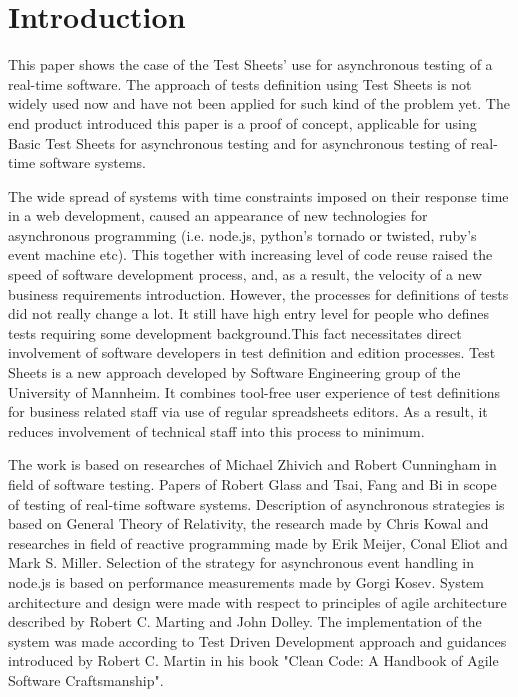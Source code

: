 \chapter{Introduction}
\label{chap:intro}
This paper shows the case of the Test Sheets' use for asynchronous testing of a real-time software. The approach of tests definition using Test Sheets is not widely used now and have not been applied for such kind of the problem yet.
The end product introduced this paper is a proof of concept,  applicable for using Basic Test Sheets for asynchronous testing and for asynchronous testing of real-time software systems.

The wide spread of systems with time constraints imposed on their response time in a web development, caused an appearance of new technologies for asynchronous programming (i.e. node.js, python's tornado or twisted, ruby's event machine etc). This together with increasing level of code reuse raised the speed of software development process, and, as a result, the velocity of a new business requirements introduction. However, the processes for definitions of tests did not really change a lot. It still have high entry level for people who defines tests requiring some development background.This fact necessitates direct involvement of software developers in test definition and edition processes. Test Sheets is a new approach developed by Software Engineering group of the University of Mannheim. It combines  tool-free user experience of test definitions for business related staff via use of regular spreadsheets editors. As a result, it reduces involvement of technical staff into this process to minimum.


The work is based on researches of Michael Zhivich and Robert Cunningham in field of software testing. Papers of Robert Glass and Tsai, Fang  and Bi in scope of testing of real-time software systems. Description of asynchronous strategies is based on General Theory of Relativity, the research made by Chris Kowal and researches in field of reactive programming made by Erik Meijer, Conal Eliot and Mark S. Miller. Selection of the strategy for asynchronous event handling in node.js is based on  performance measurements made by Gorgi Kosev. System  architecture and design were made with respect to principles of agile architecture described by Robert  C. Marting and John Dolley. The implementation of the system was made according to Test Driven Development approach and guidances introduced by Robert C. Martin in his book "Clean Code: A Handbook of Agile Software Craftsmanship".


